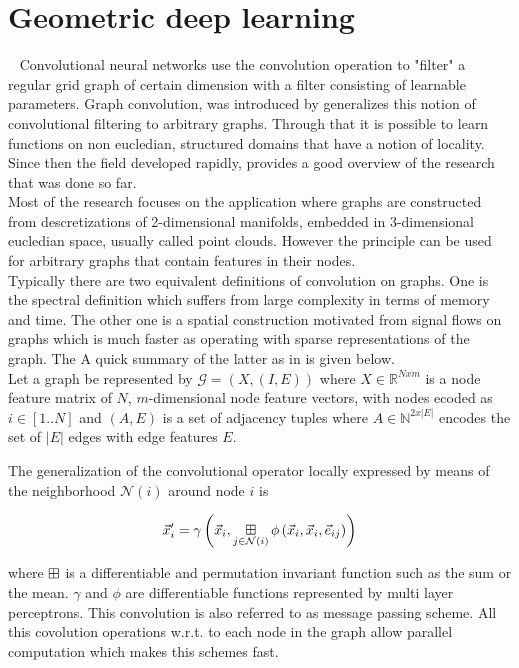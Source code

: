 \section{Geometric deep learning}~\label{sec:gcn}
Convolutional neural networks use the convolution operation to "filter" a regular grid graph of certain dimension with a filter consisting of learnable parameters. Graph convolution, was introduced by \cite{bruna2013spectral} generalizes this notion of convolutional filtering to arbitrary graphs. Through that it is possible to learn functions on non eucledian, structured domains that have a notion of locality.\\
Since then the field developed rapidly, \cite{Bronstein_2017} provides a good overview of the research that was done so far.\\
Most of the research focuses on the application where graphs are constructed from descretizations of 2-dimensional manifolds, embedded in 3-dimensional eucledian space, usually called point clouds. However the principle can be used for arbitrary graphs that contain features in their nodes.\\
Typically there are two equivalent definitions of convolution on graphs. One is the spectral definition which suffers from large complexity in terms of memory and time. The other one is a spatial construction motivated from signal flows on graphs which is much faster as operating with sparse representations of the graph. The A quick summary of the latter as in \cite{gilmer2017neural} is given below. \\

Let a graph be represented by $\mathcal{G}=(X, (I, E))$ where $X\in \mathbb{R}^{Nxm}$ is a node feature matrix of $N$, $m$-dimensional node feature vectors, with nodes ecoded as $i \in[1..N]$ and $(A, E)$ is a set of adjacency tuples where $A\in \mathbb{N}^{2x|E|}$ encodes the set of $|E|$ edges with edge features $E$.

The generalization of the convolutional operator locally expressed by means of the neighborhood $\mathcal{N}(i)$ around node $i$ is

\begin{align}
	\vec{x}_i^\prime = \gamma \left(\vec{x}_i, \operatorname*{\boxplus}_{j \in \mathcal{N}(i)}  \phi \left(\vec{x}_i, \vec{x}_i, \vec{e}_{ij} \right) \right)
\end{align}

where $\operatorname*{\boxplus}$ is a differentiable and permutation invariant function such as the sum or the mean. $\gamma$ and $\phi$ are differentiable functions represented by multi layer perceptrons. This convolution is also referred to as message passing scheme. All this covolution operations w.r.t. to each node in the graph allow parallel computation which makes this schemes fast.



